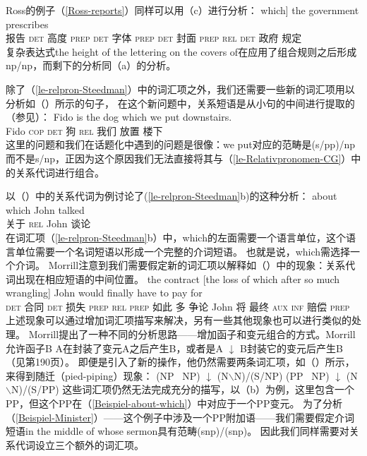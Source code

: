 Ross的例子（\ref{Ross-reports}）同样可以用（c）进行分析：
\ea
\gll [reports    [the height of the lettering on the covers of] which] the government prescribes\\
     \spacebr{}报告 \spacebr\textsc{det} 高度 \textsc{prep} \textsc{det} 字体 \textsc{prep} \textsc{det} 封面 \textsc{prep} \textsc{rel} \textsc{det} 政府 规定\\
\z
复杂表达式the height of the lettering on the covers of在应用了组合规则之后形成np/np，而剩下的分析同（a）的分析。

除了（\ref{le-relpron-Steedman}）中的词汇项之外，我们还需要一些新的词汇项用以分析如（）所示的句子，
在这个新问题中，关系短语是从小句的中间进行提取的（参见\citealp[]{Pollard88a}）：
\ea
\gll Fido is the dog which we put downstairs. \\
     Fido \textsc{cop} \textsc{det} 狗 \textsc{rel} 我们 放置 楼下 \\
\z
这里的问题和我们在话题化中遇到的问题是很像：we put对应的范畴是(s/pp)/np而不是s/np，正因为这个原因我们无法直接将其与（\ref{le-Relativpronomen-CG}）中的关系代词进行组合。

 \citet[]{Morrill95a}以（）中的关系代词为例讨论了(\ref{le-relpron-Steedman}b)的这种分析：
\ea
\label{Beispiel-about-which}
\gll about which John talked \\
     关于 \textsc{rel} John 谈论 \\
\z
在词汇项（\ref{le-relpron-Steedman}b）中，which的左面需要一个语言单位，这个语言单位需要一个名词短语以形成一个完整的介词短语。
也就是说，which需选择一个介词。
Morrill注意到我们需要假定新的词汇项以解释如（）中的现象：关系代词出现在相应短语的中间位置。
\ea
\gll the          contract [the                 loss of           which after so much wrangling] John would finally have to pay for \\
     \textsc{det} 合同      \spacebr\textsc{det} 损失 \textsc{prep} \textsc{rel} \textsc{prep} 如此 多 争论 John 将 最终 \textsc{aux} \textsc{inf} 赔偿 \textsc{prep}\\
\z
上述现象可以通过增加词汇项描写来解决，另有一些其他现象也可以进行类似的处理。
Morrill提出了一种不同的分析思路——增加函子和变元组合的方式。Morrill允许函子B \up
\isc{$\uparrow$}\is{$\uparrow$} A在封装了变元A之后产生B，或者是A $\downarrow$
\isc{$\downarrow$}\is{$\downarrow$} B封装它的变元后产生B（见第190页）。
即便是引入了新的操作，他仍然需要两条词汇项，如（）所示，来得到随迁（pied-piping）现象：
\eal
\ex (NP \up\ NP) $\downarrow$ (N$\backslash$N)/(S/NP)
\ex (PP \up\ NP) $\downarrow$ (N$\backslash$N)/(S/PP)
\zl
这些词汇项仍然无法完成充分的描写，以（b）为例，这里包含一个PP，但这个PP在（\ref{Beispiel-about-which}）中对应于一个PP变元。 
为了分析（\ref{Beispiel-Minister}）——这个例子中涉及一个PP附加语——我们需要假定介词短语in the middle of whose sermon具有范畴(s\bs np)/(s\bs np)。
因此我们同样需要对关系代词设立三个额外的词汇项。

